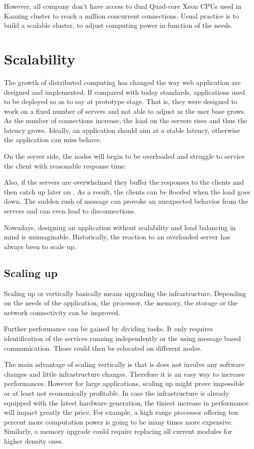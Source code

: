 However, all company don't have access to dual Quad-core Xeon CPUs used in
Kaazing cluster to reach a million concurrent connections. Usual practice is to
build a scalable cluster, to adjust computing power in function of the needs.

\section{Scalability}

The growth of distributed computing has changed the way web application are
designed and implemented. If compared with today standards, applications used
to be deployed so as to say at prototype stage. That is, they were designed to
work on a fixed number of servers and not able to adjust as the user base grows.
As the number of connections increase, the load on the servers rises and thus
the latency grows. Ideally, an application should aim at a stable latency,
otherwise the application can miss behave.

On the server side, the nodes will begin to be overloaded and struggle to
service the client with reasonable response time.

Also, if the servers are overwhelmed they buffer the responses to the clients
and then catch up later on . As a result, the clients can be flooded when the
load goes down. The sudden rush of message can provoke an unexpected behavior
from the servers and can even lead to disconnections.

Nowadays, designing an application without scalability and load balancing in
mind is unimaginable. Historically, the reaction to an overloaded server
has always been to scale up.

\subsection{Scaling up}

Scaling up or vertically basically means upgrading the infrastructure.
Depending on the needs of the application, the processor, the memory, the
storage or the network connectivity can be improved.

Further performance can be gained by dividing tasks. It only requires
identification of the services  running independently or the using message
based communication. Those could then be relocated on different nodes.

The main advantage of scaling vertically is that is does not involve any software
changes and little infrastructure changes. Therefore it is an easy way to
increase performances. However for large applications, scaling up might prove
impossible or at least not economically profitable. In case the infrastructure 
is already equipped with the latest hardware generation, the tiniest
increase in performance will impact greatly the price. For example, a high
range processor offering ten percent more computation power is going to be
many times more expensive. Similarly, a memory upgrade could require replacing
all current modules for higher density ones.

